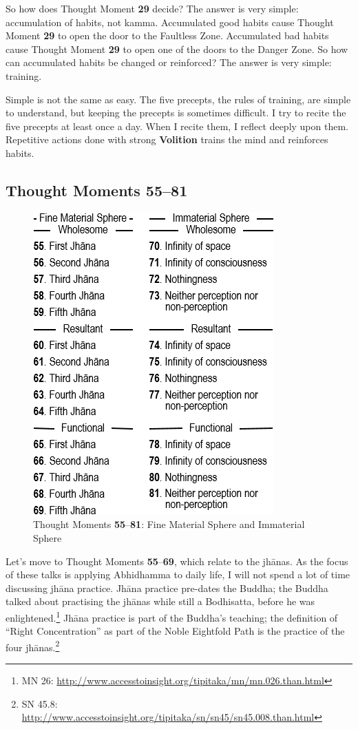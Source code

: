 So how does Thought Moment \textbf{29} decide? The answer is very simple: accumulation of habits, not kamma. Accumulated good habits cause Thought Moment \textbf{29} to open the door to the Faultless Zone. Accumulated bad habits cause Thought Moment \textbf{29} to open one of the doors to the Danger Zone. So how can accumulated habits be changed or reinforced? The answer is very simple: training.

Simple is not the same as easy. The five precepts, the rules of training, are simple to understand, but keeping the precepts is sometimes difficult. I try to recite the five precepts at least once a day. When I recite them, I reflect deeply upon them. Repetitive actions done with strong \textbf{Volition} trains the mind and reinforces habits.

\subsection*{Thought Moments 55--81}

\begin{figure}[h]
\centering
\includegraphics[width=0.5\linewidth]{./Diagrams/55to81}
\caption{Thought Moments \textbf{55}--\textbf{81}: Fine Material Sphere and Immaterial Sphere}
\label{fig:55to81}
\end{figure}

Let’s move to Thought Moments \textbf{55}--\textbf{69}, which relate to the jhānas. As the focus of these talks is applying Abhidhamma to daily life, I will not spend a lot of time discussing jhāna practice. Jhāna practice pre-dates the Buddha; the Buddha talked about practising the jhānas while still a Bodhisatta, before he was enlightened.\footnote{MN 26: \url{http://www.accesstoinsight.org/tipitaka/mn/mn.026.than.html}} Jhāna practice is part of the Buddha’s teaching; the definition of “Right Concentration” as part of the Noble Eightfold Path is the practice of the four jhānas.\footnote{SN 45.8: \url{http://www.accesstoinsight.org/tipitaka/sn/sn45/sn45.008.than.html}}

